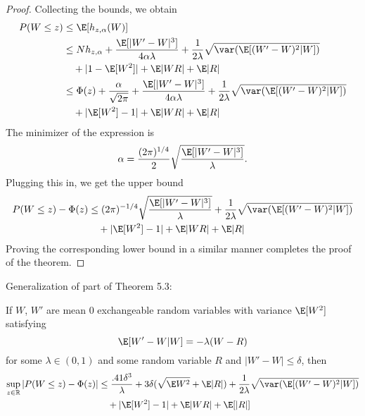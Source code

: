 \begin{proof}
  Collecting the bounds, we obtain
  \begin{equation}
    \begin{split}
      P(W \leq z) &\leq \E [h_{z,\alpha}(W)] \\
      &\leq Nh_{z,\alpha} + \frac{\E [|W'-W|^3]}{4 \alpha \lambda}
      + \frac{1}{2\lambda} \sqrt{\var (\E [(W'-W)^2|W])} \\
      &\quad + |1 - \E [W^2]| + \E |WR| + \E |R| \\
      &\leq \Phi (z) + \frac{\alpha}{\sqrt{2\pi}} + \frac{\E [|W'-W|^3]}{4 \alpha \lambda}
      + \frac{1}{2\lambda} \sqrt{\var (\E [(W'-W)^2|W])} \\
      &\quad + |\E [W^2] - 1| + \E |WR| + \E |R|
    \end{split}
  \end{equation}
  The minimizer of the expression is
  \begin{equation}
    \alpha = \frac{(2\pi)^{1/4}}{2}\sqrt{\frac{\E [|W'-W|^3]}{\lambda}}.
  \end{equation}
  Plugging this in, we get the upper bound
  \begin{equation}
    \begin{split}
      P(W \leq z) - \Phi(z) &\leq (2\pi)^{-1/4} \sqrt{\frac{\E [|W'-W|^3]}{\lambda}}
      + \frac{1}{2\lambda} \sqrt{\var (\E [(W'-W)^2|W])} \\
      &\quad + |\E [W^2] - 1| + \E |WR| + \E |R|
    \end{split}
  \end{equation}
  Proving the corresponding lower bound in a similar manner completes the proof of the theorem.
\end{proof}

Generalization of part of Theorem 5.3:
\begin{theorem}
  \label{T:better-rate}
  If $W$, $W'$ are mean 0 exchangeable random variables with variance $\E[W^2]$
  satisfying
  \begin{equation*}
    \E[W'-W|W] = -\lambda(W-R)
  \end{equation*}
  for some $\lambda \in (0,1)$ and some random variable $R$ and $|W'-W| \leq \delta$, then
  \begin{equation*}
    \begin{split}
      \sup_{z \in \mathbb{R}} |P(W \leq z) - \Phi(z)|
      &\leq \frac{.41 \delta^3}{\lambda} + 3 \delta (\sqrt{\E W^2} + \E |R|)
      + \frac{1}{2\lambda} \sqrt{\var (\E [(W'-W)^2|W])} \\
      &\quad + |\E [W^2] - 1| + \E |WR| + \E [|R|]
    \end{split}
  \end{equation*}
\end{theorem}

